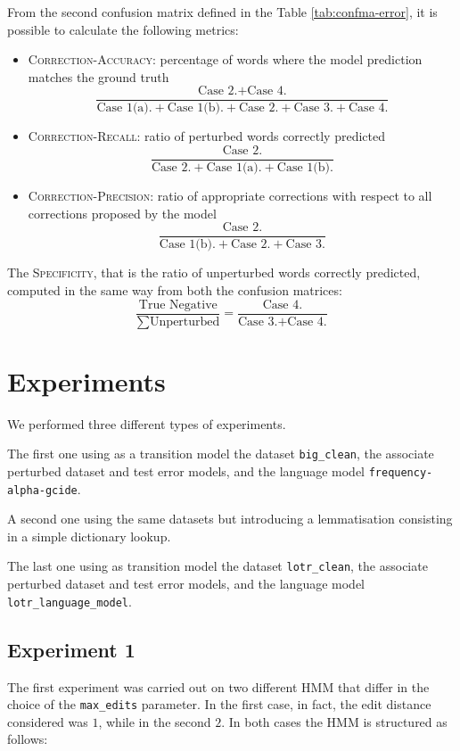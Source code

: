 From the second confusion matrix defined in the Table \ref{tab:confma-error}, it is possible to calculate the following 
metrics:
\begin{itemize}
	\item \textsc{Correction-Accuracy}: percentage of words where the model prediction matches the 
	ground truth  
	\[ \frac{\mbox{Case 2.} + \mbox{Case 4.}}{\mbox{Case 1(a).}+ \mbox{Case 1(b).}+ \mbox{Case 2.} + \mbox{Case 3.} 
	+ \mbox{Case 4.}}\]
	\item \textsc{Correction-Recall}: ratio of perturbed words correctly predicted
	\[ \frac{\mbox{Case 2.}}{\mbox{Case 2.} + \mbox{Case 1(a).}+ \mbox{Case 1(b).}}\]
	\item \textsc{Correction-Precision}: ratio of appropriate corrections with respect to all corrections proposed by the 
	model
		\[ \frac{\mbox{Case	2.}}{\mbox{Case 1(b).}+ \mbox{Case 2.} + \mbox{Case 3.}}\]
\end{itemize}

The \textsc{Specificity}, that is the ratio of unperturbed words correctly predicted, computed in the same way from both 
the confusion matrices:
\[ \frac{\mbox{True Negative}}{\sum \mbox{Unperturbed}} = \frac{\mbox{Case 4.}}{\mbox{Case 3.} + 
	\mbox{Case 4.}}\]

\section{Experiments}
We performed three different types of experiments.

The first one using as a transition model the dataset \texttt{big\_clean}, the associate perturbed dataset and test error 
models, and the language model \texttt{frequency-alpha-gcide}.

A second one using the same datasets but introducing a lemmatisation consisting in a simple dictionary lookup.

The last one using as transition model the dataset \texttt{lotr\_clean}, the associate perturbed dataset and test error 
models, and the language model \texttt{lotr\_language\_model}.\\

\subsection{Experiment 1}
The first experiment was carried out on two different HMM that differ in the choice of the \texttt{max\_edits} 
parameter.
In the first case, in fact, the edit distance considered was $1$, while in the second $2$.
In both cases the HMM is structured as follows:

